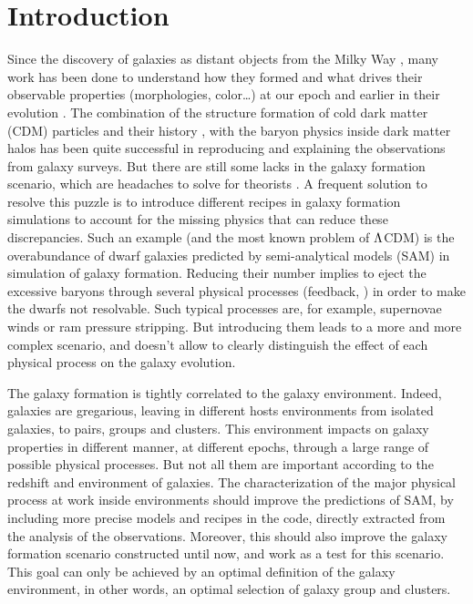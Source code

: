 \chapter{Introduction}

\minitoc%

Since the discovery of galaxies as distant objects from the Milky Way
\citep{Hubble+29}, many work has been done to understand how they formed and
what drives their observable properties (morphologies, color\ldots) at our
epoch and earlier in their evolution \citep{Benson+10,Silk+12,Silk+13}. The
combination of the structure formation of cold dark matter (CDM) particles
and their history \citep{Zentner+07}, with the baryon physics inside dark
matter halos \citep{Kravtsov+12} has been quite successful in reproducing
and explaining the observations from galaxy surveys. But there are still
some lacks in the galaxy formation scenario, which are headaches to solve
for theorists \citep{Weinmann+12}. A frequent solution to resolve this
puzzle is to introduce different recipes in galaxy formation simulations to
account for the missing physics that can reduce these discrepancies.
%
Such an example (and the most known problem of $\rm \Lambda$CDM) is the
overabundance of dwarf galaxies predicted by semi-analytical models (SAM) in
simulation of galaxy formation. Reducing their number implies to eject the
excessive baryons through several physical processes (feedback,
\citet{Brooks+13}) in order to make the dwarfs not resolvable. Such typical
processes are, for example, supernovae winds \citep{Hirschmann+13} or ram
pressure stripping. But introducing them leads to a more and more
complex scenario, and doesn't allow to clearly distinguish the effect of
each physical process on the galaxy evolution.

The galaxy formation is tightly correlated to the galaxy environment.
Indeed, galaxies are gregarious, leaving in different hosts environments
from isolated galaxies, to pairs, groups and clusters. This environment
impacts on galaxy properties in different manner, at different epochs,
through a large range of possible physical processes. But not all them are
important according to the redshift and environment of galaxies. The
characterization of the major physical process at work inside environments
should improve the predictions of SAM, by including more precise models and
recipes in the code, directly extracted from the analysis of the
observations. Moreover, this should also improve the galaxy formation
scenario constructed until now, and work as a test for this scenario. This
goal can only be achieved by an optimal definition of the galaxy
environment, in other words, an optimal selection of galaxy group and
clusters.

